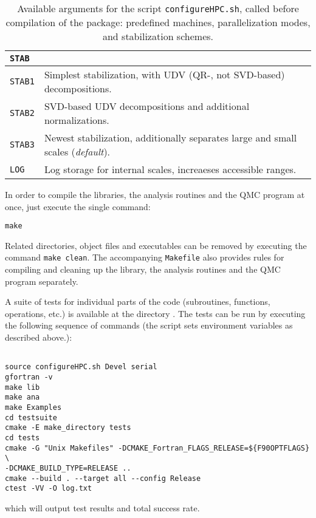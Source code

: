 \begin{table}[h]
\begin{center}
\begin{tabular}{@{} l l @{}}
			\textbf{\texttt{STAB}} &  \\\midrule
			\texttt{STAB1}  &  Simplest stabilization, with UDV (QR-, not SVD-based) decompositions.\\
			\texttt{STAB2}  &  SVD-based UDV decompositions and additional normalizations.\\
			\texttt{STAB3}  &  Newest stabilization, additionally separates large and small scales (\emph{default}).\\
			\texttt{LOG}  &  Log storage for internal scales, increaeses accessible ranges.\\\bottomrule
		\end{tabular}
		\caption{Available arguments for the script \texttt{configureHPC.sh}, called before compilation of the package: predefined machines, parallelization modes, and stabilization schemes.} \label{table:configureHPC}
	\end{center}
\end{table}

In order to compile the libraries, the analysis routines and the QMC program at once, just execute the single command:%
\begin{lstlisting}[style=bash,morekeywords={make}]
make
\end{lstlisting}
Related directories, object files and executables can be removed by executing the command \lstinline[style=bash,morekeywords={make}]{make clean}. The accompanying \texttt{Makefile} also provides rules for compiling and cleaning up the library, the analysis routines and the QMC program separately.  

A suite of tests for individual parts of the code (subroutines, functions, operations, etc.) is available at the directory . The tests can be run by executing the following sequence of commands (the script  sets environment variables as described above.):
\begin{lstlisting}[style=bash,morekeywords={make,cmake,ctest}]

source configureHPC.sh Devel serial
gfortran -v
make lib
make ana
make Examples
cd testsuite
cmake -E make_directory tests
cd tests
cmake -G "Unix Makefiles" -DCMAKE_Fortran_FLAGS_RELEASE=${F90OPTFLAGS} \
-DCMAKE_BUILD_TYPE=RELEASE ..
cmake --build . --target all --config Release
ctest -VV -O log.txt
\end{lstlisting}
which will output test results and total success rate.

%
